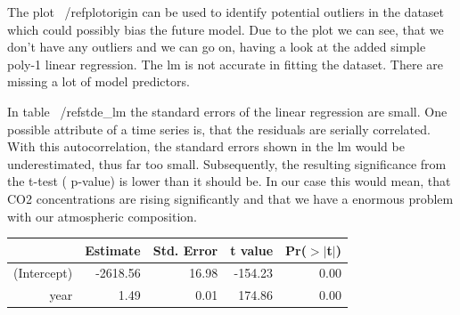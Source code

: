 \documentclass[11pt, a4paper]{article} %
\begin{document}
The plot ~/ref{plotorigin} can be used to identify potential outliers in the dataset which could possibly bias the future model.  Due to the plot we can see, that we don't have any outliers and we can go on, having a look at the added simple poly-1 linear regression. The lm is not accurate in fitting the dataset. There are missing a lot of model predictors.

In table ~/ref{stde_lm}  the standard errors of the linear regression are small.  One possible attribute of a time series is, that the residuals are serially correlated. With this autocorrelation, the standard errors shown in the lm would be underestimated, thus far too small.  Subsequently, the resulting significance  from the t-test ( p-value) is lower than it should be. In our case this would mean, that CO2 concentrations are rising significantly and that we have a enormous problem with our atmospheric composition. 

\begin{Schunk}
\begin{table}[ht]
\centering
\begin{tabular}{rrrrr}
  \hline
 & Estimate & Std. Error & t value & Pr($>$$|$t$|$) \\ 
  \hline
(Intercept) & -2618.56 & 16.98 & -154.23 & 0.00 \\ 
  year & 1.49 & 0.01 & 174.86 & 0.00 \\ 
   \hline
\end{tabular}
\end{table}\end{Schunk}
\end{document}
